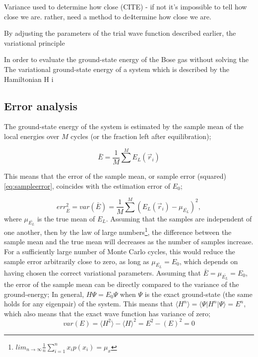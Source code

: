 \documentclass[%
oneside,                 %
final,                   %
10pt]{article}
\begin{document}
Variance used to determine how close (CITE) - if not it's impossible to tell how close we are. rather, need a method to de4termine how close we are.


By adjusting the parameters of the trial wave function described earlier, the variational principle 


In order to evaluate the ground-state energy of the Bose gas without solving the 
The variational  ground-state energy of a system which is described by the Hamiltonian H i
 
\subsection{Error analysis} \label{importance_sampling}
The ground-state energy of the system is estimated by the sample mean of the local energies over $M$ cycles (or the fraction left after equilibration);

\begin{equation}
\bar{E}=\frac{1}{M}\sum^M E_L(\vec r_i)
\label{eq:estimated_energy}
\end{equation}

This means that the error of the sample mean, or sample error (squared) \eqref{eq:sampleerror}, coincides with the estimation error of $E_0$;

\begin{equation}
err^2_{\bar{E}}=var(\bar E)=\frac{1}{M} \sum^M (E_L(\vec r_i) - \mu_{\bar{E_L}})^2,
\label{eq:sampleerror}
\end{equation}
where $\mu_{\bar{E_L}}$ is the true mean of $E_L$. Assuming that the samples are independent of one another, then by the law of large numbers\footnote{ $ lim_{n\rightarrow \infty} \frac{1}{n} \sum^n_{i=1} x_i p(x_i)= \mu_x $}, the difference between the sample mean and the true mean will decreases as the number of samples increase. For a sufficiently large number of Monte Carlo cycles, this would reduce the sample error arbitrarily close to zero, as long as $\mu_{\bar{E_L}}=E_0$, which depends on having chosen the correct variational parameters. Assuming that $\bar{E}=\mu_{\bar{E_L}}=E_0$, the error of the sample mean can be directly compared to the variance of the ground-energy;
In general, $H\Psi = E_0 \Psi$ when $\Psi$ is the exact ground-state (the same holds for any eigenpair) of the system. This means that $\langle H^n \rangle=\langle \Psi \rvert H^n \lvert \Psi \rangle=E^n$, which also means that the exact wave function has variance of zero;
\begin{equation}
var(E)= \langle H^2 \rangle-\langle H \rangle^2 = E^2 -(E)^2= 0
\end{equation}
\end{document}
